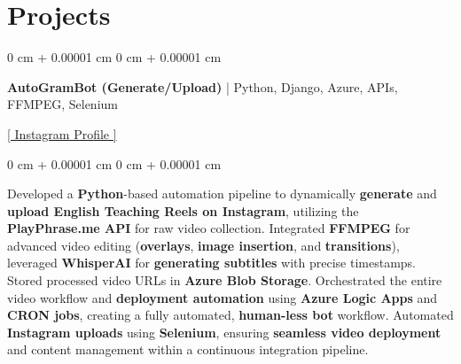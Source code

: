 \documentclass[10pt, letterpaper]{article}
\newenvironment{highlights}{
    \begin{itemize}[
        topsep=0.10 cm,
        parsep=0.10 cm,
        partopsep=0pt,
        itemsep=0pt,
        leftmargin=0 cm + 10pt
    ]
}{
    \end{itemize}
} %
\newenvironment{onecolentry}{
    \begin{adjustwidth}{
        0 cm + 0.00001 cm
    }{
        0 cm + 0.00001 cm
    }
}{
    \end{adjustwidth}
} %
\newenvironment{twocolentry}[2][]{
    \onecolentry
    \def\secondColumn{#2}
    \setcolumnwidth{\fill, 4.5 cm}
    \begin{paracol}{2}
}{
    \switchcolumn \raggedleft \secondColumn
    \end{paracol}
    \endonecolentry
} %
\begin{document}
        \vspace{0.2 cm}

        
        \section{Projects}
        \begin{twocolentry} {
            \href{https://instagram.com/thatvocabgirl}{[ Instagram Profile ]}
        }
            \textbf{AutoGramBot (Generate/Upload)} | Python, Django, Azure, APIs, FFMPEG, Selenium
        \end{twocolentry}
        \begin{onecolentry}
            \begin{highlights}
                Developed a \textbf{Python}-based automation pipeline to dynamically \textbf{generate} and \textbf{upload English Teaching Reels on Instagram}, utilizing the \textbf{PlayPhrase.me API} for raw video collection. Integrated \textbf{FFMPEG} for advanced video editing (\textbf{overlays}, \textbf{image insertion}, and \textbf{transitions}), leveraged \textbf{WhisperAI} for \textbf{generating subtitles} with precise timestamps. Stored processed video URLs in \textbf{Azure Blob Storage}. Orchestrated the entire video workflow and \textbf{deployment automation} using \textbf{Azure Logic Apps} and \textbf{CRON jobs}, creating a fully automated, \textbf{human-less bot} workflow. Automated \textbf{Instagram uploads} using \textbf{Selenium}, ensuring \textbf{seamless video deployment} and content management within a continuous integration pipeline.
            \end{highlights}
        \end{onecolentry}
        

        \vspace{0.2 cm}
\end{document}

